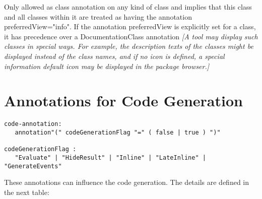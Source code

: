 Only allowed as class annotation on any kind of class and implies that
this class and all classes within it are treated as having the
annotation preferredView="info". If the annotation preferredView is
explicitly set for a class, it has precedence over a DocumentationClass
annotation \emph{{[}A tool may display such classes in special ways. For
example, the description texts of the classes might be displayed instead
of the class names, and if no icon is defined, a special information
default icon may be displayed in the package browser.{]}}

\section{Annotations for Code Generation}
\begin{lstlisting}[language=grammar]
code-annotation:
   annotation"(" codeGenerationFlag "=" ( false | true ) ")"

codeGenerationFlag :
   "Evaluate" | "HideResult" | "Inline" | "LateInline" | "GenerateEvents"
\end{lstlisting}
These annotations can influence the code generation. The details are
defined in the next table:

